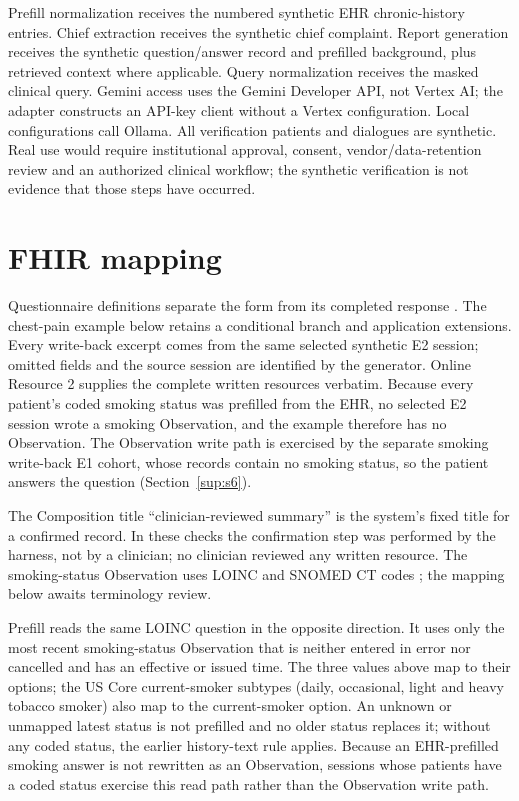 Prefill normalization receives the numbered synthetic EHR chronic-history entries.
Chief extraction receives the synthetic chief complaint. Report generation receives
the synthetic question/answer record and prefilled background, plus retrieved
context where applicable. Query normalization receives the masked clinical query.
Gemini access uses the Gemini Developer API, not Vertex AI; the adapter constructs
an API-key client without a Vertex configuration. Local configurations call Ollama.
All verification patients and dialogues are synthetic. Real use would require
institutional approval, consent, vendor/data-retention review and an authorized
clinical workflow; the synthetic verification is not evidence that those steps
have occurred.

\section{FHIR mapping}\label{sup:s2}
Questionnaire definitions separate the form from its completed response
\citep{fhirQuestionnaireR4,sdcIG}. The chest-pain example below retains a conditional
branch and application extensions. Every write-back excerpt comes from the same
selected synthetic E2 session; omitted fields and the source session are identified
by the generator. Online Resource 2 supplies the complete written resources
verbatim. Because every patient's coded smoking status was prefilled from the
EHR, no selected E2 session wrote a smoking Observation, and the example therefore
has no Observation. The Observation write path is exercised by the separate smoking write-back E1
cohort, whose records contain no smoking status, so the patient answers the question
(Section~\ref{sup:s6}).

The Composition title ``clinician-reviewed summary'' is the system's fixed title
for a confirmed record. In these checks the confirmation step was performed
by the harness, not by a clinician; no clinician reviewed any written resource.
The smoking-status Observation uses LOINC and SNOMED CT codes
\citep{mcdonaldLoinc2003,snomedCt}; the mapping below awaits terminology review.

Prefill reads the same LOINC question in the opposite direction. It uses only the
most recent smoking-status Observation that is neither entered in error nor
cancelled and has an effective or issued time. The three values above map to their
options; the US Core current-smoker subtypes (daily, occasional, light and heavy
tobacco smoker) also map to the current-smoker option. An unknown or unmapped
latest status is not prefilled and no older status replaces it; without any coded
status, the earlier history-text rule applies. Because an EHR-prefilled smoking
answer is not rewritten as an Observation, sessions whose patients have a coded
status exercise this read path rather than the Observation write path.


